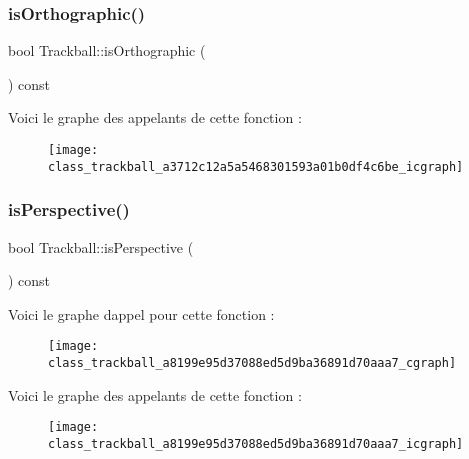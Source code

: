 \subsubsection{\texorpdfstring{is\+Orthographic()}{isOrthographic()}}
{\footnotesize\ttfamily bool Trackball\+::is\+Orthographic (\begin{DoxyParamCaption}{ }\end{DoxyParamCaption}) const}

Voici le graphe des appelants de cette fonction \+:\nopagebreak
\begin{figure}[H]
\begin{center}
\leavevmode
\texttt{[image: class\_trackball\_a3712c12a5a5468301593a01b0df4c6be\_icgraph]}
\end{center}
\end{figure}
\mbox{\label{class_trackball_a8199e95d37088ed5d9ba36891d70aaa7}} 
\subsubsection{\texorpdfstring{is\+Perspective()}{isPerspective()}}
{\footnotesize\ttfamily bool Trackball\+::is\+Perspective (\begin{DoxyParamCaption}{ }\end{DoxyParamCaption}) const}

Voici le graphe d\textquotesingle{}appel pour cette fonction \+:\nopagebreak
\begin{figure}[H]
\begin{center}
\leavevmode
\texttt{[image: class\_trackball\_a8199e95d37088ed5d9ba36891d70aaa7\_cgraph]}
\end{center}
\end{figure}
Voici le graphe des appelants de cette fonction \+:\nopagebreak
\begin{figure}[H]
\begin{center}
\leavevmode
\texttt{[image: class\_trackball\_a8199e95d37088ed5d9ba36891d70aaa7\_icgraph]}
\end{center}
\end{figure}
\mbox{\label{class_trackball_a78fa30a8e6ffad74df3488aa3cc009c4}} 
